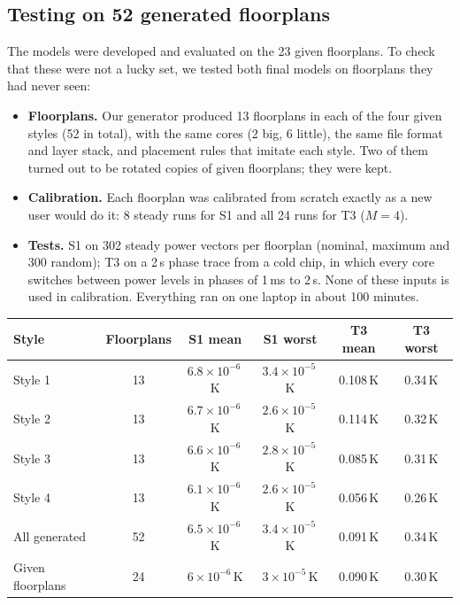 \documentclass[11pt,a4paper]{article}
\begin{document}
\subsection{Testing on 52 generated floorplans}
The models were developed and evaluated on the 23 given floorplans. To check that these were not a
lucky set, we tested both final models on floorplans they had never seen:
\begin{itemize}
  \item \textbf{Floorplans.} Our generator produced 13 floorplans in each of the four given styles
        (52 in total), with the same cores (2 big, 6 little), the same file format and layer
        stack, and placement rules that imitate each style. Two of them turned out to be rotated
        copies of given floorplans; they were kept.
  \item \textbf{Calibration.} Each floorplan was calibrated from scratch exactly as a new user would
        do it: 8 steady runs for S1 and all 24 runs for T3 ($M=4$).
  \item \textbf{Tests.} S1 on 302 steady power vectors per floorplan (nominal, maximum and 300
        random); T3 on a 2\,s phase trace from a cold chip, in which every core switches between
        power levels in phases of 1\,ms to 2\,s. None of these inputs is used in calibration.
        Everything ran on one laptop in about 100 minutes.
\end{itemize}

\begin{center}
\small
\begin{tabular}{@{}l c c c c c@{}}
\toprule
Style & Floorplans & S1 mean & S1 worst & T3 mean & T3 worst \\
\midrule
Style 1 & 13 & $6.8\times10^{-6}$\,K & $3.4\times10^{-5}$\,K & 0.108\,K & 0.34\,K \\
Style 2 & 13 & $6.7\times10^{-6}$\,K & $2.6\times10^{-5}$\,K & 0.114\,K & 0.32\,K \\
Style 3 & 13 & $6.6\times10^{-6}$\,K & $2.8\times10^{-5}$\,K & 0.085\,K & 0.31\,K \\
Style 4 & 13 & $6.1\times10^{-6}$\,K & $2.6\times10^{-5}$\,K & 0.056\,K & 0.26\,K \\
All generated & 52 & $6.5\times10^{-6}$\,K & $3.4\times10^{-5}$\,K & 0.091\,K & 0.34\,K \\
Given floorplans & 24 & $6\times10^{-6}$\,K & $3\times10^{-5}$\,K & 0.090\,K & 0.30\,K \\
\bottomrule
\end{tabular}
\end{center}
\end{document}
